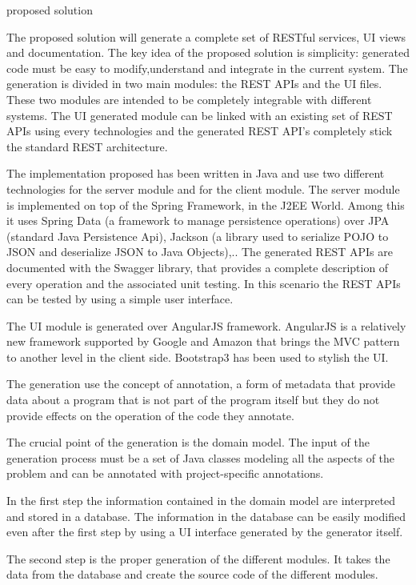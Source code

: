 proposed solution

The proposed solution will generate a complete set of RESTful services, UI views and documentation.
The key idea of the proposed solution is simplicity: generated code must be easy to modify,understand and integrate in the current system. 
The generation is divided in two main modules: the REST APIs and the UI files.
These two modules are intended to be completely integrable with different systems. The UI generated module can be linked with an existing set of REST APIs using every technologies and the generated REST API’s completely stick the standard REST architecture.

The implementation proposed has been written in Java and use two different technologies for the server module and for the client module.
The server module is implemented on top of the Spring Framework, in the J2EE World. Among this it uses Spring Data (a framework to manage persistence operations) over JPA (standard Java Persistence Api), Jackson (a library used to serialize POJO to JSON and deserialize JSON to Java Objects),..
The generated REST APIs are documented with the Swagger library, that provides a complete description of every operation and the associated unit testing. In this scenario the REST APIs can be tested by using a simple user interface.

The UI module is generated over AngularJS framework. AngularJS is a relatively new framework supported by Google and Amazon that brings the MVC pattern to another level in the client side. Bootstrap3 has been used to stylish the UI.

The generation use the concept of annotation, a form of metadata that provide data about a program that is not part of the program itself but they do not provide effects on the operation of the code they annotate.

The crucial point of the generation is the domain model. The input of the generation process must be a set of Java classes modeling all the aspects of the problem and can be annotated with project-specific annotations.

In the first step the information contained in the domain model are interpreted and stored in a database. The information in the database can be easily modified even after the first step by using a UI interface generated by the generator itself.

The second step is the proper generation of the different modules. It takes the data from the database and create the source code of the different modules.

